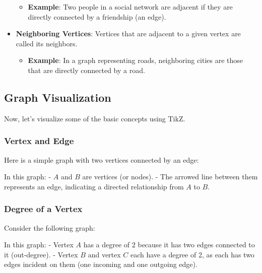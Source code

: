 \documentclass{book}
\begin{document}
\begin{itemize}
    \begin{itemize}
        \item \textbf{Example}: Two people in a social network are adjacent if they are directly connected by a friendship (an edge).
    \end{itemize}
    \item \textbf{Neighboring Vertices}: Vertices that are adjacent to a given vertex are called its neighbors.
    \begin{itemize}
        \item \textbf{Example}: In a graph representing roads, neighboring cities are those that are directly connected by a road.
    \end{itemize}
\end{itemize}

\subsection{Graph Visualization}

Now, let's visualize some of the basic concepts using TikZ.

\subsubsection{Vertex and Edge}
Here is a simple graph with two vertices connected by an edge:


In this graph:
- \(A\) and \(B\) are vertices (or nodes).
- The arrowed line between them represents an edge, indicating a directed relationship from \(A\) to \(B\).

\subsubsection{Degree of a Vertex}
Consider the following graph:


In this graph:
- Vertex \(A\) has a degree of 2 because it has two edges connected to it (out-degree).
- Vertex \(B\) and vertex \(C\) each have a degree of 2, as each has two edges incident on them (one incoming and one outgoing edge).
\end{document}
